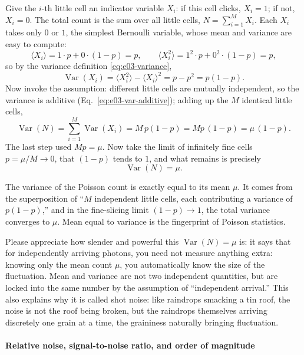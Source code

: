 Give the $i$-th little cell an indicator variable $X_i$: if this cell clicks, $X_i=1$; if not, $X_i=0$. The total count is the sum over all little cells, $N=\sum_{i=1}^{M}X_i$. Each $X_i$ takes only $0$ or $1$, the simplest Bernoulli variable, whose mean and variance are easy to compute:
\[
  \langle X_i\rangle=1\cdot p+0\cdot(1-p)=p,\qquad
  \langle X_i^{2}\rangle=1^{2}\cdot p+0^{2}\cdot(1-p)=p ,
\]
so by the variance definition \eqref{eq:e03-variance},
\[
  \operatorname{Var}(X_i)=\langle X_i^{2}\rangle-\langle X_i\rangle^{2}=p-p^{2}=p(1-p).
\]
Now invoke the assumption: different little cells are mutually independent, so the variance is additive (Eq.~\eqref{eq:e03-var-additive}); adding up the $M$ identical little cells,
\[
  \operatorname{Var}(N)=\sum_{i=1}^{M}\operatorname{Var}(X_i)=M\,p(1-p)=Mp\,(1-p)=\mu\,(1-p).
\]
The last step used $Mp=\mu$. Now take the limit of infinitely fine cells $p=\mu/M\to0$, that $(1-p)$ tends to $1$, and what remains is precisely
\begin{equation}
  \operatorname{Var}(N)=\mu .
  \label{eq:e03-var-equals-mean}
\end{equation}
\begin{formulaexplain}
The variance of the Poisson count is exactly equal to its mean $\mu$. It comes from the superposition of ``$M$ independent little cells, each contributing a variance of $p(1-p)$,'' and in the fine-slicing limit $(1-p)\to1$, the total variance converges to $\mu$. Mean equal to variance is the fingerprint of Poisson statistics.
\end{formulaexplain}
Please appreciate how slender and powerful this $\operatorname{Var}(N)=\mu$ is: it says that for independently arriving photons, you need not measure anything extra: knowing only the mean count $\mu$, you automatically know the size of the fluctuation. Mean and variance are not two independent quantities, but are locked into the same number by the assumption of ``independent arrival.'' This also explains why it is called shot noise: like raindrops smacking a tin roof, the noise is not the roof being broken, but the raindrops themselves arriving discretely one grain at a time, the graininess naturally bringing fluctuation.

\paragraph{Relative noise, signal-to-noise ratio, and order of magnitude}

